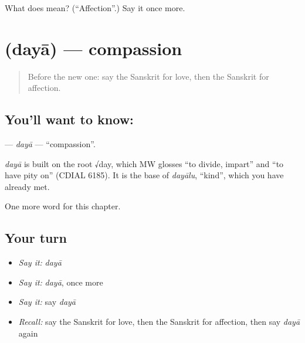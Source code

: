 \begin{tcolorbox}[breakable,colback=teal!4,colframe=teal!35!black,title={Before you move on}]
What does  mean? (\textquotedblleft{}Affection\textquotedblright{}.) Say it once more.
\end{tcolorbox}
\section[\texorpdfstring{\sk{दया} (dayā)}{दया (dayā)}]{ (dayā) — compassion}

\label{lesson:SA-C239-daya}



\begin{quote}
Before the new one: say the Sanskrit for love, then the Sanskrit for affection.
\end{quote}

\subsection*{You'll want to know: }
\textbf{} — \emph{dayā} — \textquotedblleft{}compassion\textquotedblright{}.

\begin{cousinweb}
\emph{dayā} is built on the root √day, which MW glosses \textquotedblleft{}to divide, impart\textquotedblright{} and \textquotedblleft{}to have pity on\textquotedblright{} (CDIAL 6185). It is the base of \emph{dayālu}, \textquotedblleft{}kind\textquotedblright{}, which you have already met.
\end{cousinweb}

\begin{grammarlens}[title={What you've built}]
One more word for this chapter.
\end{grammarlens}

\subsection*{Your turn}
\begin{itemize}
\raggedright
  \item \emph{Say it:} \emph{dayā}
  \item \emph{Say it:} \emph{dayā}, once more
  \item \emph{Say it:} say \emph{dayā}
  \item \emph{Recall:} say the Sanskrit for love, then the Sanskrit for affection, then say \emph{dayā} again
\end{itemize}

